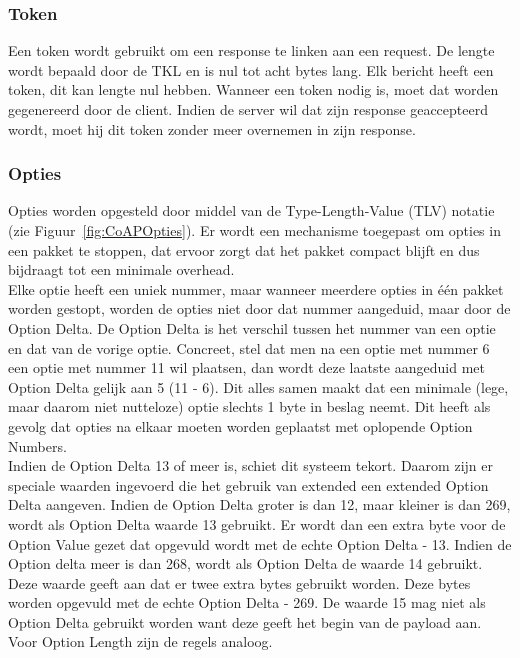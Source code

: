 \subsubsection{Token}

Een token wordt gebruikt om een response te linken aan een request. De lengte wordt bepaald door de TKL en is nul tot acht bytes lang. Elk bericht heeft een token, dit kan lengte nul hebben. Wanneer een token nodig is, moet dat worden gegenereerd door de client. Indien de server wil dat zijn response geaccepteerd wordt, moet hij dit token zonder meer overnemen in zijn response.

\newpage

\subsubsection{Opties}

Opties worden opgesteld door middel van de Type-Length-Value (TLV) notatie (zie Figuur~\ref{fig:CoAPOpties}). Er wordt een mechanisme toegepast om opties in een pakket te stoppen, dat ervoor zorgt dat het pakket compact blijft en dus bijdraagt tot een minimale overhead.\\

Elke optie heeft een uniek nummer, maar wanneer meerdere opties in \'{e}\'{e}n pakket worden gestopt, worden de opties niet door dat nummer aangeduid, maar door de Option Delta. De Option Delta is het verschil tussen het nummer van een optie en dat van de vorige optie.
Concreet, stel dat men na een optie met nummer 6 een optie met nummer 11 wil plaatsen, dan wordt deze laatste aangeduid met Option Delta gelijk aan 5 (11 - 6). Dit alles samen maakt dat een minimale (lege, maar daarom niet nutteloze) optie slechts 1 byte in beslag neemt. Dit heeft als gevolg dat opties na elkaar moeten worden geplaatst met oplopende Option Numbers.\\

Indien de Option Delta 13 of meer is, schiet dit systeem tekort. Daarom zijn er speciale waarden ingevoerd die het gebruik van extended een extended Option Delta aangeven. Indien de Option Delta groter is dan 12, maar kleiner is dan 269, wordt als Option Delta waarde 13 gebruikt. Er wordt dan een extra byte voor de Option Value gezet dat opgevuld wordt met de echte Option Delta - 13. Indien de Option delta meer is dan 268, wordt als Option Delta de waarde 14 gebruikt. Deze waarde geeft aan dat er twee extra bytes gebruikt worden. Deze bytes worden opgevuld met de echte Option Delta - 269. De waarde 15 mag niet als Option Delta gebruikt worden want deze geeft het begin van de payload aan. Voor Option Length zijn de regels analoog.


